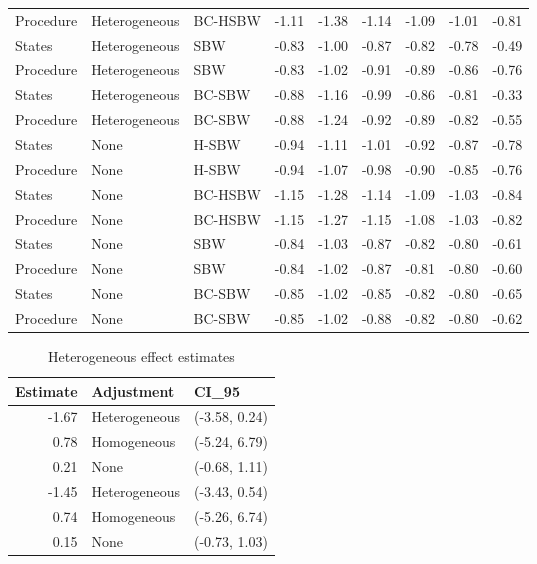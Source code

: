 \begin{table}[ht]
\begin{tabular}{lllrrrrrr}
  Procedure & Heterogeneous & BC-HSBW & -1.11 & -1.38 & -1.14 & -1.09 & -1.01 & -0.81 \\ 
  States & Heterogeneous & SBW & -0.83 & -1.00 & -0.87 & -0.82 & -0.78 & -0.49 \\ 
  Procedure & Heterogeneous & SBW & -0.83 & -1.02 & -0.91 & -0.89 & -0.86 & -0.76 \\ 
  States & Heterogeneous & BC-SBW & -0.88 & -1.16 & -0.99 & -0.86 & -0.81 & -0.33 \\ 
  Procedure & Heterogeneous & BC-SBW & -0.88 & -1.24 & -0.92 & -0.89 & -0.82 & -0.55 \\ 
  States & None & H-SBW & -0.94 & -1.11 & -1.01 & -0.92 & -0.87 & -0.78 \\ 
  Procedure & None & H-SBW & -0.94 & -1.07 & -0.98 & -0.90 & -0.85 & -0.76 \\ 
  States & None & BC-HSBW & -1.15 & -1.28 & -1.14 & -1.09 & -1.03 & -0.84 \\ 
  Procedure & None & BC-HSBW & -1.15 & -1.27 & -1.15 & -1.08 & -1.03 & -0.82 \\ 
  States & None & SBW & -0.84 & -1.03 & -0.87 & -0.82 & -0.80 & -0.61 \\ 
  Procedure & None & SBW & -0.84 & -1.02 & -0.87 & -0.81 & -0.80 & -0.60 \\ 
  States & None & BC-SBW & -0.85 & -1.02 & -0.85 & -0.82 & -0.80 & -0.65 \\ 
  Procedure & None & BC-SBW & -0.85 & -1.02 & -0.88 & -0.82 & -0.80 & -0.62 \\ 
   \hline
\end{tabular}
\end{table}

\begin{table}[ht]
\caption{Heterogeneous effect estimates}
\label{tab:hte}
\centering
\begin{tabular}{rll}
  \hline
Estimate & Adjustment & CI\_95 \\ 
  \hline
-1.67 & Heterogeneous & (-3.58, 0.24) \\ 
  0.78 & Homogeneous & (-5.24, 6.79) \\ 
  0.21 & None & (-0.68, 1.11) \\ 
  -1.45 & Heterogeneous & (-3.43, 0.54) \\ 
  0.74 & Homogeneous & (-5.26, 6.74) \\ 
  0.15 & None & (-0.73, 1.03) \\ 
   \hline
\end{tabular}
\end{table}
